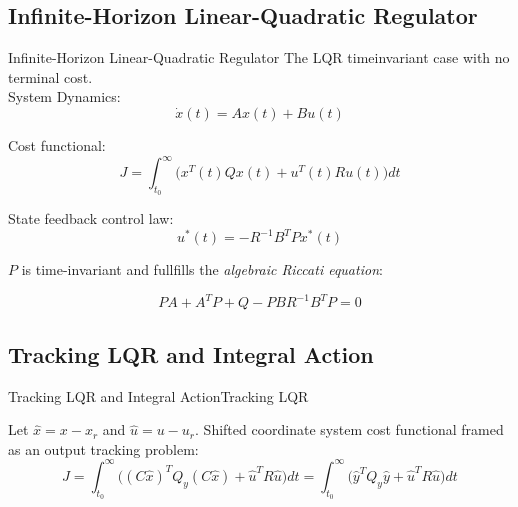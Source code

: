 \subsection{Infinite-Horizon Linear-Quadratic Regulator}
\begin{frame}{Infinite-Horizon Linear-Quadratic Regulator}
	The LQR timeinvariant case with no terminal cost.\\
	System Dynamics:
	\begin{equation}
		\dot{x}(t) = Ax(t) + Bu(t) \label{eq:TimeInvariantLinearSystem}
	\end{equation}

	Cost functional:		
	\begin{equation}\label{eq:LagrangeProblem}
		J = \int_{t_0}^{\infty} \big(x^T(t)Qx(t) + u^T(t)Ru(t)\big)dt
	\end{equation} 

	State feedback control law:
	\begin{equation}\label{eq:InfLQRFeedbackLaw}
		u^*(t) = -R^{-1}B^TPx^*(t)
	\end{equation}
	
	$P$ is time-invariant and fullfills the \textit{algebraic Riccati equation}:
	
	\begin{equation}\label{eq:ARE}
		PA + A^TP + Q - PBR^{-1}B^TP = 0
	\end{equation}
\end{frame}

\subsection{Tracking LQR and Integral Action}
\begin{frame}{Tracking LQR and Integral Action}{Tracking LQR}
	 
	
	Let $\hat{x} = x-x_r$ and $\hat{u} = u-u_r$. Shifted coordinate system cost functional framed as an output tracking problem:
	\begin{equation}\label{eq:LagrangeProblemOutput}
		J = \int_{t_0}^{\infty} \big((C\hat{x})^TQ_y(C\hat{x}) + \hat{u}^TR\hat{u}\big)dt = \int_{t_0}^{\infty} \big(\hat{y}^TQ_y\hat{y} + \hat{u}^TR\hat{u}\big)dt
	\end{equation} 
\end{frame}


